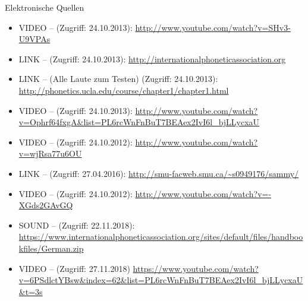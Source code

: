 \begin{frame}[allowframebreaks]{Elektronische Quellen}

	\footnotesize
	
	\begin{itemize}
	
		\item VIDEO --  (Zugriff: 24.10.2013): \url{http://www.youtube.com/watch?v=SHv3-U9VPAs}

		\item LINK --  (Zugriff: 24.10.2013): \url{http://internationalphoneticassociation.org}

		\item LINK --  (Alle Laute zum Testen) (Zugriff: 24.10.2013):
		\url{http://phonetics.ucla.edu/course/chapter1/chapter1.html}
		
		\item VIDEO --  (Zugriff: 24.10.2013): \url{http://www.youtube.com/watch?v=Ophrf64fxgA&list=PL6rcWnFnBuT7BEAex2IvI6l_bjLLycxaU}

		\item VIDEO --  (Zugriff: 24.10.2012): \url{http://www.youtube.com/watch?v=wjRsa77u6OU}

		\item LINK --  (Zugriff: 27.04.2016): \url{http://smu-facweb.smu.ca/~s0949176/sammy/}

		\item VIDEO --  (Zugriff: 24.10.2012): \url{http://www.youtube.com/watch?v=-XGds2GAvGQ}
		
		\item SOUND --  (Zugriff: 22.11.2018):
		\url{https://www.internationalphoneticassociation.org/sites/default/files/handbookfiles/German.zip}
		
		\item VIDEO --  (Zugriff: 27.11.2018)
		\url{https://www.youtube.com/watch?v=6PSdlctYBsw&index=62&list=PL6rcWnFnBuT7BEAex2IvI6l_bjLLycxaU&t=3s}
	\end{itemize}
	
\end{frame}


